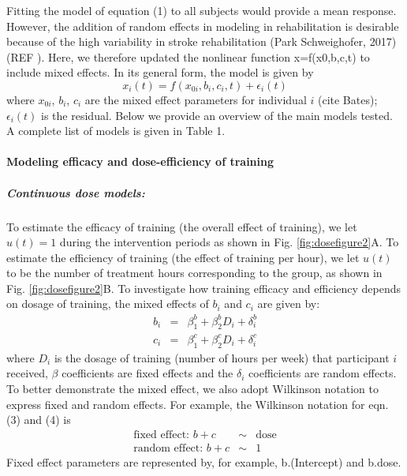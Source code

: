 Fitting the model of equation (1) to all subjects would provide a mean response. 
However, the addition of random effects in modeling in rehabilitation is desirable because of the high variability in stroke rehabilitation (Park  Schweighofer, 2017) (REF ).  
Here, we therefore updated the nonlinear function x=f(x0,b,c,t) to include mixed effects. In its general form, the model is given by
\begin{equation}\label{eqn:nonlinear}
	x_i (t)=f(x_{0i},b_i,c_i,t) + \epsilon_i (t)
\end{equation}
where $ x_{0i} $, $ b_i $, $ c_i $ are the mixed effect parameters for individual $ i $ (cite Bates); $ \epsilon_i (t) $ is the residual. 
Below we provide an overview of the main models tested. 
A complete list of models is given in Table 1.

\paragraph{Modeling efficacy and dose-efficiency of training}
\subparagraph{Continuous dose models: } 
To estimate the efficacy of training (the overall effect of training), we let $ u(t)=1 $ during the intervention periods as shown in Fig. \ref{fig:dosefigure2}A. 
To estimate the efficiency of training (the effect of training per hour), we let $ u(t) $ to be the number of treatment hours corresponding to the group, as shown in Fig. \ref{fig:dosefigure2}B.  
To investigate how training efficacy and efficiency depends on dosage of training, the mixed effects of $ b_i $ and $ c_i $ are given by:
\begin{eqnarray}\label{eqn:mixedeffect}
	b_i &=& \beta_1^b + \beta_2^b D_i + \delta_i^b   \nonumber \\
	c_i &=& \beta_1^c + \beta_2^c D_i + \delta_i^c   
\end{eqnarray}
where $ D_i $ is the dosage of training (number of hours per week) that participant $ i $ received, 
$ \beta $ coefficients are fixed effects and the $ \delta_i $ coefficients are random effects. 
To better demonstrate the mixed effect, we also adopt Wilkinson notation to express fixed and random effects. 
For example, the Wilkinson notation for eqn. (3) and (4) is
\begin{eqnarray}
	\text{fixed effect: } b + c  &\sim& \text{dose} \\
	\text{random effect: } b + c &\sim& 1
\end{eqnarray}
Fixed effect parameters are represented by, for example, b.(Intercept) and b.dose.

